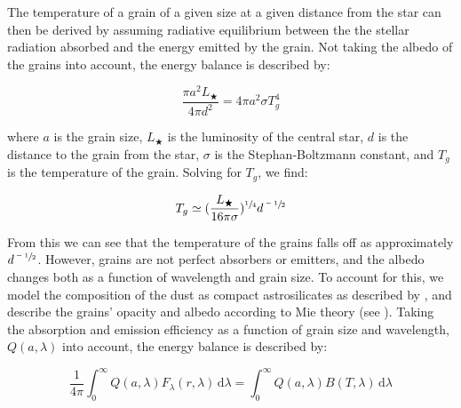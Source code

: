 


The temperature of a grain of a given size at a given distance from the star can then be derived by assuming radiative equilibrium between the the stellar radiation absorbed and the energy emitted by the grain. Not taking the albedo of the grains into account, the energy balance is described by:

\begin{equation}\label{EBalance}
\frac{\pi a^{2} L_{\bigstar}}{4 \pi d^{2}} = 4 \pi a^{2} \sigma T_{g}^{4}
\end{equation}

where $a$ is the grain size, $L_{\bigstar}$ is the luminosity of the central star, $d$ is the distance to the grain from the star, $\sigma$ is the Stephan-Boltzmann constant, and $T_{g}$ is the temperature of the grain. Solving for $T_{g}$, we find:

\begin{equation}\label{tEst}
T_{g} \simeq (\frac{L_{\bigstar}}{16 \pi \sigma})^{\sfrac{1}{4}} d^{\sfrac{-1}{2}}
\end{equation}

From this we can see that the temperature of the grains falls off as approximately $d^{\sfrac{-1}{2}}$. However, grains are not perfect absorbers or emitters, and the albedo changes both as a function of wavelength and grain size. To account for this, we model the composition of the dust as compact astrosilicates as described by \cite{Drai03}, and describe the grains' opacity and albedo according to Mie theory (see \citealt{Bohr83}). Taking the absorption and emission efficiency as a function of grain size and wavelength, $Q(a,\lambda)$ into account, the energy balance is described by:

\begin{equation}
\label{eq:fullEBalance}
\frac{1}{4\pi} \int_0^\infty Q(a,\lambda)F_{\lambda}(r,\lambda)\,\mathrm{d}\lambda = \int_0^\infty Q(a,\lambda)B(T,\lambda)\,\mathrm{d}\lambda
\end{equation}

